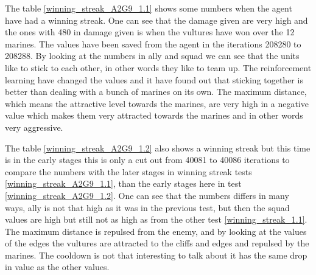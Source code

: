 
The table \ref{winning_streak_A2G9_1.1} shows some numbers when the agent have had a winning streak. One can see that the damage given are very high and the ones with 480 in damage given is when the vultures have won over the 12 marines. The values have been saved from the agent in the iterations 208280 to 208288. By looking at the numbers in ally and squad we can see that the units like to stick to each other, in other words they like to team up. The reinforcement learning have changed the values and it have found out that sticking together is better than dealing with a bunch of marines on its own. The maximum distance, which means the attractive level towards the marines, are very high in a negative value which makes them very attracted towards the marines and in other words very aggressive. 







The table \ref{winning_streak_A2G9_1.2} also shows a winning streak but this time is in the early stages this is only a cut out from 40081 to 40086 iterations to compare the numbers with the later stages in winning streak tests \ref{winning_streak_A2G9_1.1}, than the early stages here in test \ref{winning_streak_A2G9_1.2}. One can see that the numbers differs in many ways, ally is not that high as it was in the previous test, but then the squad values are high but still not as high as from the other test \ref{winning_streak_1.1}. The maximum distance is repulsed from the enemy, and by looking at the values of the edges the vultures are attracted to the cliffs and edges and repulsed by the marines. The cooldown is not that interesting to talk about it has the same drop in value as the other values.

